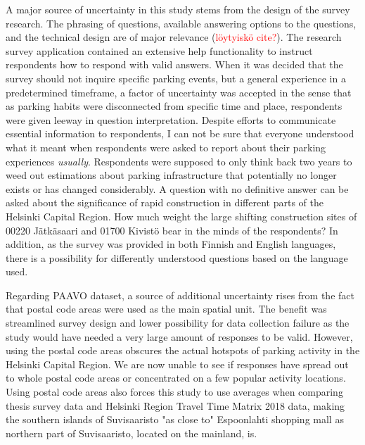 A major source of uncertainty in this study stems from the design of the survey research. The phrasing of questions, available answering options to the questions, and the technical design are of major relevance (\textcolor{red}{löytyiskö cite?}). The research survey application contained an extensive help functionality to instruct respondents how to respond with valid answers. When it was decided that the survey should not inquire specific parking events, but a general experience in a predetermined timeframe, a factor of uncertainty was accepted in the sense that as parking habits were disconnected from specific time and place, respondents were given leeway in question interpretation. Despite efforts to communicate essential information to respondents, I can not be sure that everyone understood what it meant when respondents were asked to report about their parking experiences \textit{usually}. Respondents were supposed to only think back two years to weed out estimations about parking infrastructure that potentially no longer exists or has changed considerably. A question with no definitive answer can be asked about the significance of rapid construction in different parts of the Helsinki Capital Region. How much weight the large shifting construction sites of 00220 Jätkäsaari and 01700 Kivistö bear in the minds of the respondents? In addition, as the survey was provided in both Finnish and English languages, there is a possibility for differently understood questions based on the language used.

Regarding PAAVO dataset, a source of additional uncertainty rises from the fact that postal code areas were used as the main spatial unit. The benefit was streamlined survey design and lower possibility for data collection failure as the study would have needed a very large amount of responses to be valid. However, using the postal code areas obscures the actual hotspots of parking activity in the Helsinki Capital Region. We are now unable to see if responses have spread out to whole postal code areas or concentrated on a few popular activity locations. Using postal code areas also forces this study to use averages when comparing thesis survey data and Helsinki Region Travel Time Matrix 2018 data, making the southern islands of Suvisaaristo "as close to" Espoonlahti shopping mall as northern part of Suvisaaristo, located on the mainland, is.

